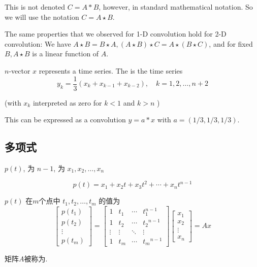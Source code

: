 This is not denoted $ C=A * B $, however, in standard mathematical notation. So we will use the notation $ C=A \star B $.

The same properties that we observed for 1-D convolution hold for 2-D convolution: We have $ A \star B=B \star A,(A \star B) \star C=A \star(B \star C) $, and for fixed $ B, A \star B $ is a linear function of $ A $.

\begin{example}
    $ n $-vector $ x $ represents a time series. The  is the time series
\begin{equation}
y_{k}=\frac{1}{3}\left(x_{k}+x_{k-1}+x_{k-2}\right), \quad k=1,2, \ldots, n+2
\end{equation}

(with $ x_{k} $ interpreted as zero for $ k<1 $ and $ k>n $ )

This can be expressed as a convolution $ y=a * x $ with $ a=(1 / 3,1 / 3,1 / 3) $.
\end{example}

\subsection{多项式}

\begin{definition}[多项式]
     $ p(t) $, 为 $ n-1 $, 为 $ x_{1}, x_{2}, \ldots, x_{n} $

    \begin{equation}
p(t)=x_{1}+x_{2} t+x_{3} t^{2}+\cdots+x_{n} t^{n-1}
\end{equation}
\end{definition}

\begin{definition}
    $ {p}({t}) $ 在$m$个点中 $ t_{1}, t_{2}, \ldots, t_{m} $ 的值为
    \begin{equation}
    \left[\begin{array}{c}
    p\left(t_{1}\right) \\
    p\left(t_{2}\right) \\
    \vdots \\
    p\left(t_{m}\right)
    \end{array}\right]=\left[\begin{array}{cccc}
    1 & t_{1} & \cdots & t_{1}^{n-1} \\
    1 & t_{2} & \cdots & t_{2}{ }^{n-1} \\
    \vdots & \vdots & \ddots & \vdots \\
    1 & t_{m} & \cdots & t_{m}{ }^{n-1}
    \end{array}\right]\left[\begin{array}{c}
    x_{1} \\
    x_{2} \\
    \vdots \\
    x_{n}
    \end{array}\right]=A x
    \end{equation}

    矩阵$A$被称为.
\end{definition}


